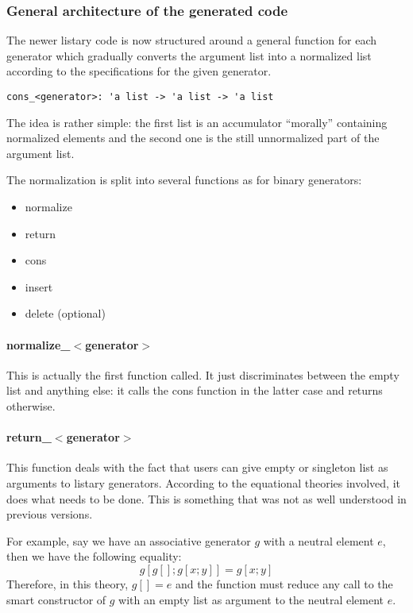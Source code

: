 \subsubsection{General architecture of the generated code}
\label{sec:arch}
The newer listary code is now structured around a general \cons function
for each generator which gradually converts the argument list into a
normalized list according to the specifications for the given generator.

\begin{verbatim}
cons_<generator>: 'a list -> 'a list -> 'a list
\end{verbatim}

The idea is rather simple:  the first list is an accumulator ``morally''
containing normalized elements and the second one is the still
unnormalized part of the argument list.

The normalization is split into several functions as for binary
generators:
\begin{itemize}
\item normalize
\item return
\item cons
\item insert
\item delete (optional)
\end{itemize}

\paragraph{normalize\_$<$generator$>$}
This is actually the first function called. It just discriminates
between the empty list and anything else: it calls the {\sf cons}
function in the latter case and returns otherwise. 

\paragraph{return\_$<$generator$>$}
This function deals with the fact that users can give empty or
singleton list as arguments to listary generators. According to the
equational theories involved, it does what needs to be done. This is
something that was not as well understood in previous versions.

For example, say we have an associative generator $g$  with a
neutral element $e$, then we have the following equality:
\[
 g [g []; g [x; y]]  =   g [x; y]
\]
 Therefore, in this theory, $ g [] = e $ and the  function
 must reduce any call to the smart constructor of $g$ with an empty
 list as argument to the neutral element $e$.

